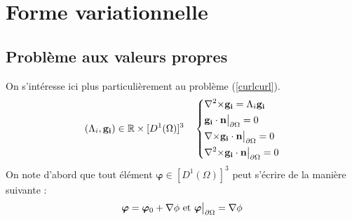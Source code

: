 \section{Forme variationnelle}
\label{fv}
\subsection{Problème aux valeurs propres}
\label{eigen}

On s'intéresse ici plus particulièrement au problème (\ref{curlcurl}).
\begin{equation}\label{pbeigen}
(\Lambda_i,\mathbf{g_i})\in{\mathbb{R}}\times [D^1(\Omega)]^3\quad \left\{\begin{aligned}
&{\nabla^2\times}  \mathbf{g_i} = \Lambda_i \mathbf{g_i}\\
&\mathbf{g_i}\cdot \mathbf{n}{\big\rvert_{\partial\Omega}} = 0\\
&{\nabla\times} \mathbf{g_i}\cdot \mathbf{n}{\big\rvert_{\partial\Omega}} = 0\\
&{\nabla^2\times}  \mathbf{g_i}\cdot \mathbf{n}{\big\rvert_{\partial\Omega}} = 0
\end{aligned}\right.
\end{equation}
On note d'abord que tout élément $\bm{\varphi}\in [D^1(\Omega)]^3$ peut s'écrire de la manière suivante :
\[ \bm{\varphi} = \bm{\varphi}_0 + {\nabla}\phi\text{ et } \bm{\varphi}{\big\rvert_{\partial\Omega}} = {\nabla}\phi \]

